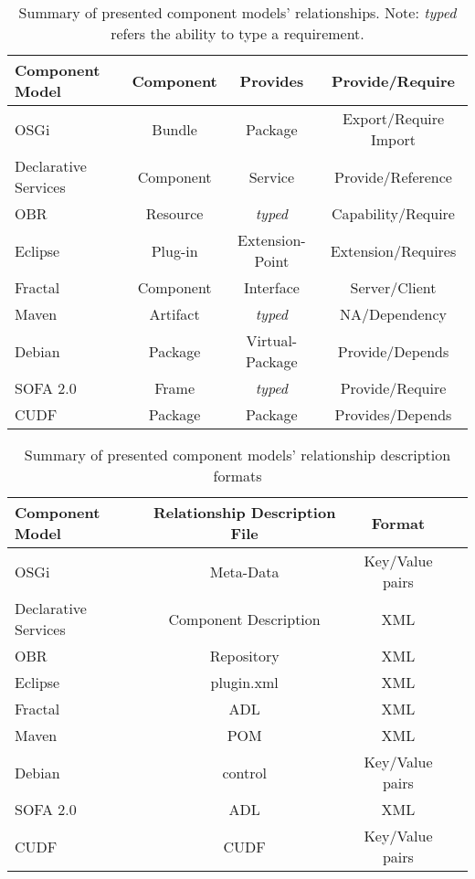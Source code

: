 \begin{table}
\begin{tabular}{|l || c | c | c | }
\hline \textbf{Component Model}& \textbf{Component}& \textbf{Provides}	& \textbf{Provide/Require}\\ \hline

OSGi					& Bundle			& Package 					& Export/Require Import \\
Declarative Services	& Component			& Service 					& Provide/Reference\\
OBR						& Resource			& \textit{typed}			& Capability/Require\\
Eclipse					& Plug-in			& Extension-Point			& Extension/Requires\\
Fractal					& Component			& Interface 				& Server/Client\\
Maven					& Artifact			& \textit{typed} 			& NA/Dependency\\
Debian					& Package			& Virtual-Package 			& Provide/Depends\\
SOFA 2.0				& Frame				& \textit{typed} 			& Provide/Require\\
CUDF					& Package			& Package 					& Provides/Depends\\\hline
\end{tabular}
\caption{Summary of presented component models' relationships. Note: \textit{typed} refers the ability to type a requirement.}
\label{background.comparisonrel}
\end{table}


\begin{table}
\begin{tabular}{|l || c | c | c | }
\hline \textbf{Component Model}& \textbf{Relationship Description File} & \textbf{Format}	\\\hline

OSGi					& Meta-Data				& Key/Value pairs 					\\
Declarative Services	& Component Description	& XML 								\\
OBR						& Repository			& XML								\\
Eclipse					& plugin.xml			& XML								\\
Fractal					& ADL					& XML 								\\
Maven					& POM					& XML 									\\
Debian					& control				& Key/Value pairs							\\
SOFA 2.0				& ADL					& XML 							\\
CUDF					& CUDF					& Key/Value pairs									\\\hline
\end{tabular}
\caption{Summary of presented component models' relationship description formats}
\label{background.comparisonmeta}
\end{table}

